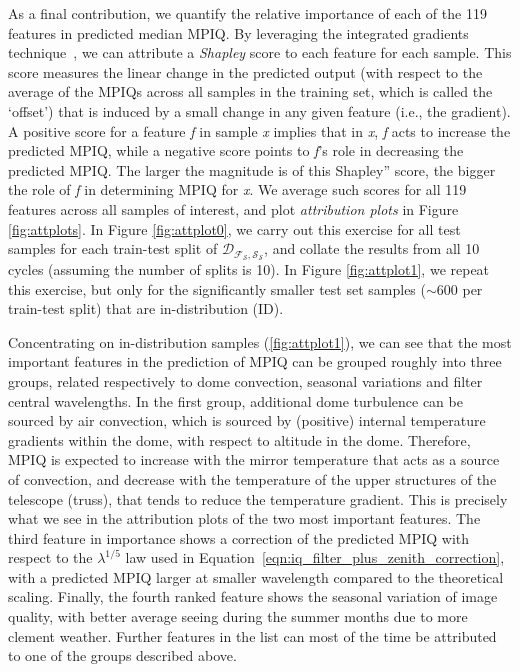As a final contribution, we quantify the relative importance of each of the 119 features in predicted median MPIQ. By leveraging the integrated gradients technique~\citep{explaining_explanations_hessians}, we can attribute a \textit{Shapley} score to each feature for each sample. This score measures the linear change in the predicted output (with respect to the average of the MPIQs across all samples in the training set, which is called the `offset') that is induced by a small change in any given feature (i.e., the gradient). A positive score for a feature \textit{f} in sample \textit{x} implies that in \textit{x}, \textit{f} acts to increase the predicted MPIQ, while a negative score points to \textit{f}'s role in decreasing the predicted MPIQ. The larger the magnitude is of this Shapley'' score, the bigger the role of \textit{f} in determining MPIQ for \textit{x}. We average such scores for all 119 features across all samples of interest, and plot {\it attribution plots} in Figure \ref{fig:attplots}. In Figure \ref{fig:attplot0}, we carry out this exercise for all test samples for each train-test split of  $\mathcal{D_{F_S,S_S}}$, and collate the results from all 10 cycles (assuming the number of splits is 10). In Figure \ref{fig:attplot1}, we repeat this exercise, but only for the significantly smaller test set samples ($\sim600$ per train-test split) that are in-distribution (ID). 

Concentrating on in-distribution samples (\ref{fig:attplot1}), we can see that the most important features in the prediction of MPIQ can be grouped roughly into three groups, related respectively to dome convection, seasonal variations and filter central wavelengths. In the first group, additional dome turbulence can be sourced by air convection, which is sourced by (positive) internal temperature gradients within the dome, with respect to altitude in the dome. Therefore, MPIQ is expected to increase with the mirror temperature that acts as a source of convection, and decrease with the temperature of the upper structures of the telescope (truss), that tends to reduce the temperature gradient. This is precisely what we see in the attribution plots of the two most important features. The third feature in importance shows a correction of the predicted MPIQ with respect to the $\lambda^{1/5}$ law used in Equation~\ref{eqn:iq_filter_plus_zenith_correction}, with a predicted MPIQ larger at smaller wavelength compared to the theoretical scaling. Finally, the fourth ranked feature shows the seasonal variation of image quality, with better average seeing during the summer months due to more clement weather. Further features in the list can most of the time be attributed to one of the groups described above.

